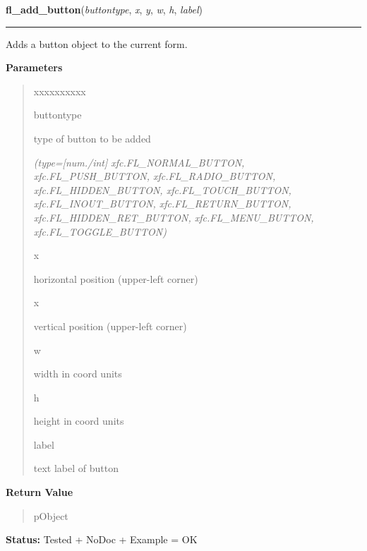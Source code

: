 \hspace{.8\funcindent}\begin{boxedminipage}{\funcwidth}

    \raggedright \textbf{fl\_add\_button}(\textit{buttontype}, \textit{x}, \textit{y}, \textit{w}, \textit{h}, \textit{label})

    \vspace{-1.5ex}

    \rule{\textwidth}{0.5\fboxrule}
\setlength{\parskip}{2ex}
    Adds a button object to the current form.

\setlength{\parskip}{1ex}
      \textbf{Parameters}
      \vspace{-1ex}

      \begin{quote}
        \begin{Ventry}{xxxxxxxxxx}

          \item[buttontype]

          type of button to be added

            {\it (type=[num./int] xfc.FL\_NORMAL\_BUTTON, xfc.FL\_PUSH\_BUTTON, 
xfc.FL\_RADIO\_BUTTON, xfc.FL\_HIDDEN\_BUTTON, xfc.FL\_TOUCH\_BUTTON, 
xfc.FL\_INOUT\_BUTTON, xfc.FL\_RETURN\_BUTTON, xfc.FL\_HIDDEN\_RET\_BUTTON,
xfc.FL\_MENU\_BUTTON, xfc.FL\_TOGGLE\_BUTTON)}

          \item[x]

          horizontal position (upper-left corner)

          \item[x]

          vertical position (upper-left corner)

          \item[w]

          width in coord units

          \item[h]

          height in coord units

          \item[label]

          text label of button

        \end{Ventry}

      \end{quote}

      \textbf{Return Value}
    \vspace{-1ex}

      \begin{quote}
      pObject

      \end{quote}

\textbf{Status:} Tested + NoDoc + Example = OK



    \end{boxedminipage}

